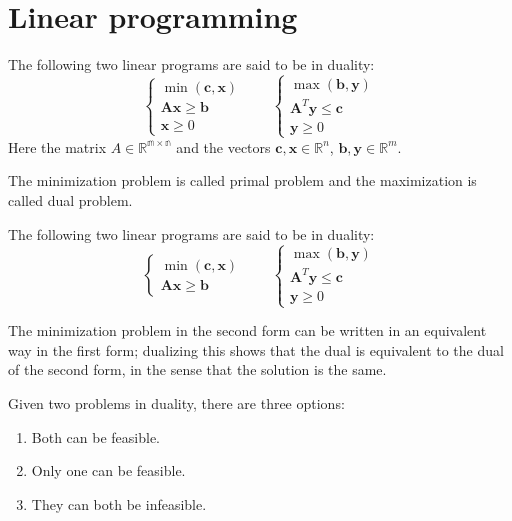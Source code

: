 \section{Linear programming}

\begin{definition}
    The following two linear programs are said to be in duality: 
    \[\begin{cases}
        \min(\mathbf{c},\mathbf{x}) \\
        \mathbf{Ax} \geq \mathbf{b} \\
        \mathbf{x} \geq 0
    \end{cases} \qquad \begin{cases}
        \max(\mathbf{b},\mathbf{y}) \\
        \mathbf{A}^T\mathbf{y} \leq \mathbf{c} \\
        \mathbf{y} \geq 0
    \end{cases}\]
    Here the matrix $A\in\mathbb{R^{m\times n}}$ and the vectors $\mathbf{c},\mathbf{x}\in\mathbb{R}^n$, $\mathbf{b},\mathbf{y}\in\mathbb{R}^m$.
\end{definition}
\noindent The minimization problem is called primal problem and the maximization is called dual problem. 

\begin{definition}
    The following two linear programs are said to be in duality: 
    \[\begin{cases}
        \min(\mathbf{c},\mathbf{x}) \\
        \mathbf{Ax} \geq \mathbf{b} 
    \end{cases} \qquad \begin{cases}
        \max(\mathbf{b},\mathbf{y}) \\
        \mathbf{A}^T\mathbf{y} \leq \mathbf{c} \\
        \mathbf{y} \geq 0
    \end{cases}\]
\end{definition}
\noindent The minimization problem in the second form can be written in an equivalent way in the first form; dualizing this shows that the dual is equivalent to the dual of the second form, in the sense that the solution is the same. 

Given two problems in duality, there are three options: 
\begin{enumerate}
    \item Both can be feasible.
    \item Only one can be feasible. 
    \item They can both be infeasible.
\end{enumerate}

